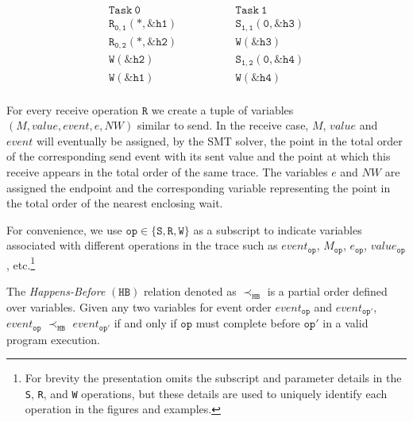 \[
\begin{array}{l|l}
\;\;\;\;\;\;\;\;\mathtt{Task\ 0}\;\;\;\;\;\;\;\; & \;\;\;\;\;\;\;\; \mathtt{Task\ 1}\;\;\;\;\;\;\;\; \\
\hline
\;\;\;\;\;\;\;\;\mathtt{R_{0,1}(*,\&h1)}\;\;\;\;\;\;\;\; & \;\;\;\;\;\;\;\; \mathtt{S_{1,1}(0,\&h3)}\;\;\;\;\;\;\;\; \\
\;\;\;\;\;\;\;\;\mathtt{R_{0,2}(*,\&h2)}\;\;\;\;\;\;\;\; & \;\;\;\;\;\;\;\; \mathtt{W{(\&h3)}}\;\;\;\;\;\;\;\; \\
\;\;\;\;\;\;\;\;\mathtt{W{(\&h2)}}\;\;\;\;\;\;\;\; & \;\;\;\;\;\;\;\; \mathtt{S_{1,2}(0,\&h4)}\;\;\;\;\;\;\;\; \\
\;\;\;\;\;\;\;\;\mathtt{W{(\&h1)}}\;\;\;\;\;\;\;\; & \;\;\;\;\;\;\;\; \mathtt{W{(\&h4)}}\;\;\;\;\;\;\;\; \\
\end{array}
\]

\begin{definition}[Receive]
For every receive operation $\mathtt{R}$ we create a tuple of
variables $(M,\mathit{value},\mathit{event},e,\mathit{NW})$ similar to
send. In the receive case, $M$, $\mathit{value}$ and $\mathit{event}$
will eventually be assigned, by the SMT solver, the point in the total
order of the corresponding send event with its sent value and the
point at which this receive appears in the total order of the same
trace. The variables $e$ and $\mathit{NW}$ are assigned the endpoint
and the corresponding variable representing the point in the total
order of the nearest enclosing wait.
\label{def:rcv}
\end{definition}

For convenience, we use $\mathtt{op} \in \{\mathtt{S}, \mathtt{R},
\mathtt{W}\}$ as a subscript to indicate variables associated with different
operations in the trace such as $\mathit{event}_\mathtt{op}$,
$M_{\mathtt{op}}$, $e_{\mathtt{op}}$, $value_{\mathtt{op}}$,
etc.\footnote{For brevity the presentation omits the subscript and
  parameter details in the \texttt{S}, \texttt{R}, and \texttt{W}
  operations, but these details are used to uniquely identify each
  operation in the figures and examples.}

\begin{definition}
The \emph{Happens-Before} $(\mathtt{HB})$ relation denoted as $\mathrm{\prec_\mathtt{HB}}$ is a partial order defined over variables. Given any two variables for event order $event_{\mathtt{op}}$ and $event_{\mathtt{op'}}$, $event_{\mathtt{op}}$ $\mathrm{\prec_{\mathtt{HB}}}$ $event_{\mathtt{op'}}$ if and only if $\mathtt{op}$ must complete before $\mathtt{op'}$ in a valid program execution.
\label{def:hb}
\end{definition}

